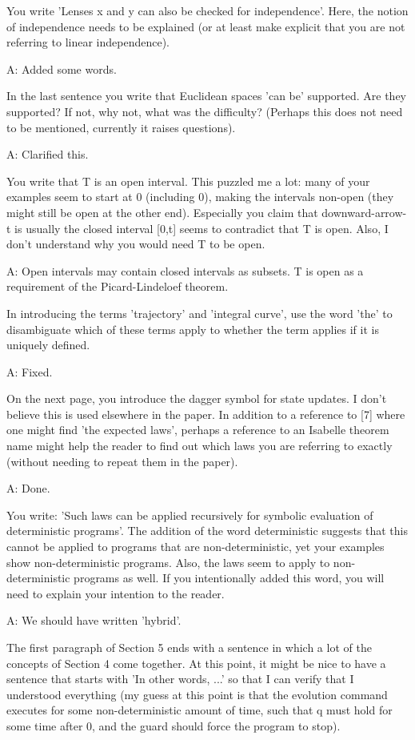 \documentclass[envcountsame,envcountsect]{llncs}
\begin{document}
You write 'Lenses x and y can also be checked for independence'. Here, the notion of independence needs to be explained (or at least make explicit that you are not referring to linear independence). 

A: Added some words.

In the last sentence you write that Euclidean spaces 'can be' supported. Are they supported? If not, why not, what was the difficulty? (Perhaps this does not need to be mentioned, currently it raises questions).

A: Clarified this.

You write that T is an open interval. This puzzled me a lot: many of your examples seem to start at 0 (including 0), making the intervals non-open (they might still be open at the other end). Especially you claim that downward-arrow-t is usually the closed interval [0,t] seems to contradict that T is open. Also, I don't understand why you would need T to be open.

A: Open intervals may contain closed intervals as subsets. T is open as a requirement of the Picard-Lindeloef theorem.

In introducing the terms 'trajectory' and 'integral curve', use the word 'the' to disambiguate which of these terms apply to whether the term applies if it is uniquely defined.

A: Fixed.

On the next page, you introduce the dagger symbol for state updates. I don't believe this is used elsewhere in the paper. In addition to a reference to [7]  where one might find 'the expected laws', perhaps a reference to an Isabelle theorem name might help the reader to find out which laws you are referring to exactly (without needing to repeat them in the paper).

A: Done.

You write: 'Such laws can be applied recursively for symbolic evaluation of deterministic programs'. The addition of the word deterministic suggests that this cannot be applied to programs that are non-deterministic, yet your examples show non-deterministic programs. Also, the laws seem to apply to non-deterministic programs as well. If you intentionally added this word, you will need to explain your intention to the reader.

A: We should have written 'hybrid'.

The first paragraph of Section 5 ends with a sentence in which a lot of the concepts of Section 4 come together. At this point, it might be nice to have a sentence that starts with 'In other words, ...' so that I can verify that I understood everything (my guess at this point is that the evolution command executes for some non-deterministic amount of time, such that q must hold for some time after 0, and the guard should force the program to stop).
\end{document}
